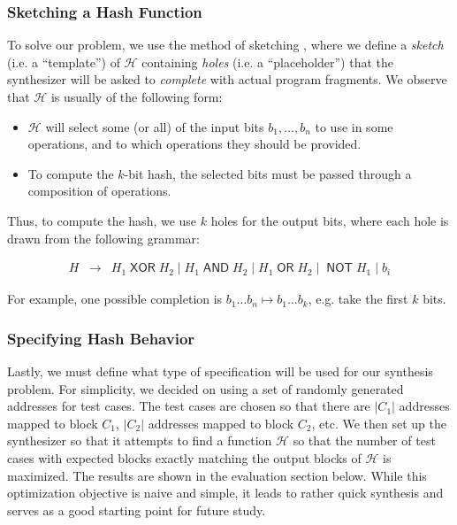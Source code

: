\subsubsection{Sketching a Hash Function}

To solve our problem, we use the method of sketching
\cite{solar-lezama-sketching}, where we define a \textit{sketch} (i.e. a
``template'') of $\mathcal{H}$ containing \textit{holes} (i.e. a
``placeholder'') that the synthesizer will be asked to \textit{complete} with
actual program fragments. We observe that $\mathcal{H}$ is usually of the
following form:
\begin{itemize}
\item $\mathcal{H}$ will select some (or all) of the input bits $b_1, \dots,
  b_n$ to use in some operations, and to which operations they should be
  provided.
\item To compute the $k$-bit hash, the selected bits must be passed through a
  composition of operations.
\end{itemize}
Thus, to compute the hash, we use $k$ holes for the output bits, where each hole
is drawn from the following grammar:

\newcommand{\bop}[1]{\mathop{\mathsf{#1}}}
\[
\begin{array}{rcl}
  H &\to& H_1 \bop{XOR} H_2 \mid H_1 \bop{AND} H_2 \mid H_1 \bop{OR} H_2
          \mid \bop{NOT} H_1 \mid b_i
\end{array}
\]

For example, one possible completion is $b_1 \dots b_n \mapsto b_1\dots b_k$,
e.g. take the first $k$ bits.

\subsubsection{Specifying Hash Behavior}

Lastly, we must define what type of specification will be used for our synthesis
problem. For simplicity, we decided on using a set of randomly generated
addresses for test cases. The test cases are chosen so that there are $|C_1|$
addresses mapped to block $C_1$, $|C_2|$ addresses mapped to block $C_2$, etc.
We then set up the synthesizer so that it attempts to find a function
$\mathcal{H}$ so that the number of test cases with expected blocks exactly
matching the output blocks of $\mathcal{H}$ is maximized. The results are shown
in the evaluation section below. While this optimization objective is naive and
simple, it leads to rather quick synthesis and serves as a good starting point
for future study.

